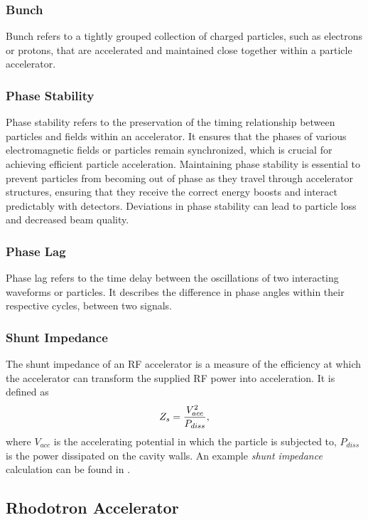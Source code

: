 \documentclass[a4paper,oneside,12pt]{report}
\numberwithin{equation}{chapter}
\begin{document}
\subsubsection{Bunch}
Bunch refers to a tightly grouped collection of charged particles, such as electrons or protons, that are accelerated and maintained close together within a particle accelerator.

\subsubsection{Phase Stability}
Phase stability refers to the preservation of the timing relationship between particles and fields within an accelerator. 
It ensures that the phases of various electromagnetic fields or particles remain synchronized, 
which is crucial for achieving efficient particle acceleration. 
Maintaining phase stability is essential to prevent particles from becoming out of phase as they travel through accelerator structures, 
ensuring that they receive the correct energy boosts and interact predictably with detectors. 
Deviations in phase stability can lead to particle loss and decreased beam quality.

\subsubsection{Phase Lag}
Phase lag refers to the time delay between the oscillations of two interacting waveforms or particles. 
It describes the difference in phase angles within their respective cycles, between two signals. 

\subsubsection{Shunt Impedance}
The shunt impedance of an RF accelerator is a measure of the efficiency 
at which the accelerator can transform the supplied RF power into acceleration.
It is defined as
\vspace{-10pt}\begin{equation} \label{eq:shunt}
    Z_s = \frac{V_{acc}^2}{P_{diss}}  ,
\vspace{-10pt}\end{equation}
where $V_{acc}$ is the accelerating potential in which the particle is subjected to, 
$P_{diss}$ is the power dissipated on the cavity walls. 
An example \textit{shunt impedance} calculation can be found in .


\subsection{Rhodotron Accelerator} \label{sec:theory_rhodo}
\end{document}
